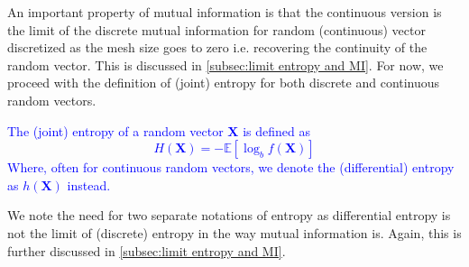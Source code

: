 \documentclass[../Thesis.tex]{subfiles}
\begin{document}
An important property of mutual information is that the continuous version is the limit of the discrete mutual information for random (continuous) vector discretized as the mesh size goes to zero i.e. recovering the continuity of the random vector. This is discussed in \autoref{subsec:limit entropy and MI}. For now, we proceed with the definition of (joint) entropy for both discrete and continuous random vectors.
\textcolor{blue}{
    \begin{definition}[Entropy]\label{def:entropy}
        The (joint) entropy of a random vector $\boldsymbol{X}$ is defined as
        $$H\left(\boldsymbol{X}\right) = - \mathbb{E}\left[\log_b f(\boldsymbol X)\right]$$
        Where, often for continuous random vectors, we denote the (differential) entropy as $h\left(\boldsymbol X\right)$ instead.
    \end{definition}
}
We note the need for two separate notations of entropy as differential entropy is not the limit of (discrete) entropy in the way mutual information is. Again, this is further discussed in \autoref{subsec:limit entropy and MI}.
\end{document}
